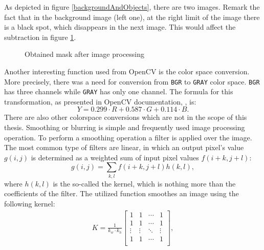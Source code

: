       As depicted in figure \ref{backgroundAndObjects}, there are two images. Remark the fact that in the background image (left one), at the right limit of the image there is a black spot, which disappears in the next image. This would affect the subtraction in figure \ref{mask}.
      \begin{figure}[t]
        \centering
        \hfil 
        \caption{Obtained mask after image processing}
        \label{mask}
      \end{figure}
Another interesting function used from OpenCV is the color space conversion. More precisely, there was a need for conversion from \verb|BGR| to \verb|GRAY| color space. \verb|BGR| has three channels while \verb|GRAY| has only one channel. The formula for this transformation, as presented in OpenCV documentation, \cite{opencv}, is:
\begin{equation}
        \label{conv}
          Y = 0.299\cdot R + 0.587\cdot G + 0.114\cdot B.
\end{equation}
      There are also other colorspace conversions which are not in the scope of this thesis. Smoothing or blurring is simple and frequently used image processing operation. To perform a smoothing operation a filter is applied over the image. The most common type of filters are linear, in which an output pixel’s value \(g(i,j)\) is determined as a weighted sum of input pixel values \(f(i+k,j+l)\):
\begin{equation}
        \label{wightedSum}
          g(i,j) = \sum_{k,l} f(i+k,j+l)h(k,l),
\end{equation}
      where \(h(k,l)\) is the so-called the kernel, which is nothing more than the coefficients of the filter. The utilized function smoothes an image using the following kernel: 
        \begin{eqnarray}
                \label{kernel}
          K = \frac{1}{k_{w}\cdot k_{h}} 
          \begin{bmatrix}
             1 & 1 & \cdots & 1 \\
             1 & 1 & \cdots & 1 \\
             \vdots  & \vdots  & \ddots & \vdots  \\
             1 & 1 & \cdots & 1 \\
           \end{bmatrix},
        \end{eqnarray}
